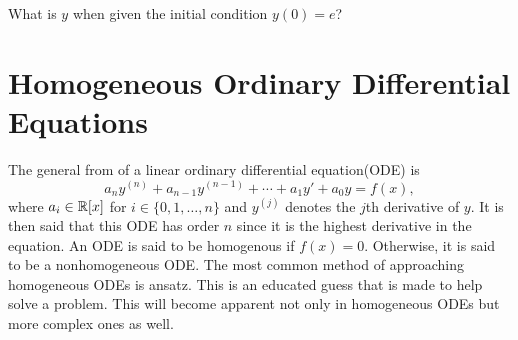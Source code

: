 \begin{question}
    What is $y$ when given the initial condition $y(0)=e$?
\end{question}

\section{Homogeneous Ordinary Differential Equations}
The general from of a linear ordinary differential equation(ODE) is
$$a_ny^{(n)} +a_{n-1}y^{(n-1)}+\cdots+a_1y'+a_0y = f(x),$$
where $a_i \in \mathbb R[x]$ for $i \in \{0, 1, \dots, n\}$ and $y^{(j)}$ denotes
the $j$th derivative of $y$. It is then said that this ODE
has \alert{order} $n$ since it is the highest derivative in the equation. An
ODE is said to be \alert{homogenous} if $f(x) = 0$. Otherwise, it is said to be 
a \alert{nonhomogeneous} ODE. The most common method of approaching homogeneous
ODEs is ansatz. This is an educated guess that is made to help solve a problem.
This will become apparent not only in homogeneous ODEs but more complex ones
as well.


